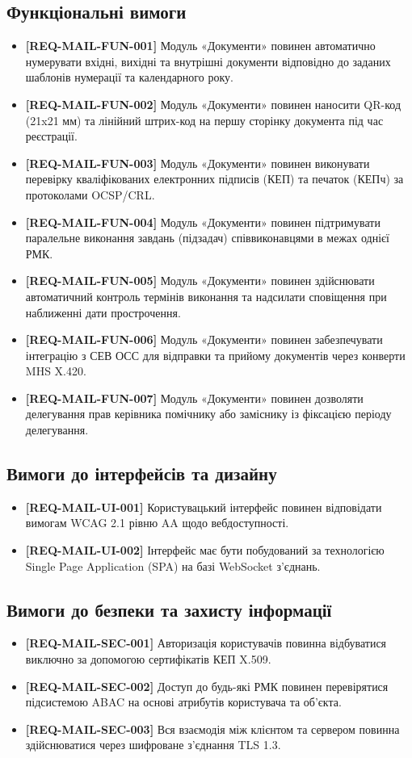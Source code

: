 \documentclass{article}
\begin{document}
\subsection{Функціональні вимоги}
\begin{itemize}
    \item \textbf{[REQ-MAIL-FUN-001]} Модуль «Документи» повинен автоматично нумерувати вхідні, вихідні та внутрішні документи відповідно до заданих шаблонів нумерації та календарного року.
    \item \textbf{[REQ-MAIL-FUN-002]} Модуль «Документи» повинен наносити QR-код (21x21 мм) та лінійний штрих-код на першу сторінку документа під час реєстрації.
    \item \textbf{[REQ-MAIL-FUN-003]} Модуль «Документи» повинен виконувати перевірку кваліфікованих електронних підписів (КЕП) та печаток (КЕПч) за протоколами OCSP/CRL.
    \item \textbf{[REQ-MAIL-FUN-004]} Модуль «Документи» повинен підтримувати паралельне виконання завдань (підзадач) співвиконавцями в межах однієї РМК.
    \item \textbf{[REQ-MAIL-FUN-005]} Модуль «Документи» повинен здійснювати автоматичний контроль термінів виконання та надсилати сповіщення при наближенні дати прострочення.
    \item \textbf{[REQ-MAIL-FUN-006]} Модуль «Документи» повинен забезпечувати інтеграцію з СЕВ ОСС для відправки та прийому документів через конверти MHS X.420.
    \item \textbf{[REQ-MAIL-FUN-007]} Модуль «Документи» повинен дозволяти делегування прав керівника помічнику або заміснику із фіксацією періоду делегування.
\end{itemize}

\subsection{Вимоги до інтерфейсів та дизайну}
\begin{itemize}
    \item \textbf{[REQ-MAIL-UI-001]} Користувацький інтерфейс повинен відповідати вимогам WCAG 2.1 рівню AA щодо вебдоступності.
    \item \textbf{[REQ-MAIL-UI-002]} Інтерфейс має бути побудований за технологією Single Page Application (SPA) на базі WebSocket з'єднань.
\end{itemize}

\subsection{Вимоги до безпеки та захисту інформації}
\begin{itemize}
    \item \textbf{[REQ-MAIL-SEC-001]} Авторизація користувачів повинна відбуватися виключно за допомогою сертифікатів КЕП X.509.
    \item \textbf{[REQ-MAIL-SEC-002]} Доступ до будь-які РМК повинен перевірятися підсистемою ABAC на основі атрибутів користувача та об'єкта.
    \item \textbf{[REQ-MAIL-SEC-003]} Вся взаємодія між клієнтом та сервером повинна здійснюватися через шифроване з'єднання TLS 1.3.
\end{itemize}
\end{document}

